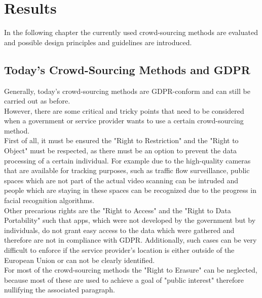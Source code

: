 \documentclass[a4paper,12pt]{report}
\begin{document}
	\chapter{Results} \label{Results}
	In the following chapter the currently used crowd-sourcing methods are evaluated and possible design principles and guidelines are introduced.
	
	\section{Today's Crowd-Sourcing Methods and GDPR} \label{juxtaposition}
	\startsection
		Generally, today's crowd-sourcing methods are GDPR-conform and can still be carried out as before. \\
		However, there are some critical and tricky points that need to be considered when a government or service provider wants to use a certain crowd-sourcing method. \\
		First of all, it must be ensured the "Right to Restriction" and the "Right to Object" must be respected, as there must be an option to prevent the data processing of a certain individual. For example due to the high-quality cameras that are available for tracking purposes, such as traffic flow surveillance, public spaces which are not part of the actual video scanning can be intruded and people which are staying in these spaces can be recognized due to the progress in facial recognition algorithms. \\
		Other precarious rights are the "Right to Access" and the "Right to Data Portability" such that apps, which were not developed by the government but by individuals, do not grant easy access to the data which were gathered and therefore are not in compliance with GDPR. Additionally, such cases can be very difficult to enforce if the service provider's location is either outside of the European Union or can not be clearly identified. \\
		For most of the crowd-sourcing methods the "Right to Erasure" can be neglected, because most of these are used to achieve a goal of "public interest" therefore nullifying the associated paragraph.
	\closesection
	
\end{document}
